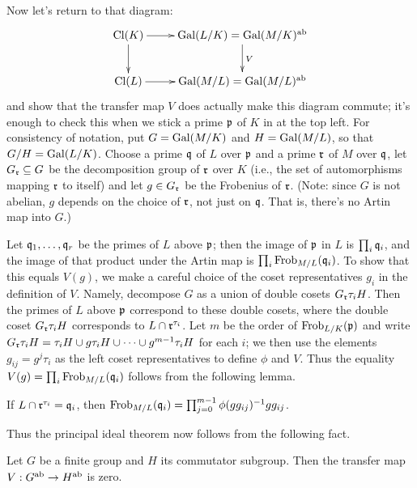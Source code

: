 Now let's return to that diagram:
\[
\xymatrix{
\Cl(K) \ar[r] \ar[d] & \Gal(L/K) = \Gal(M/K)^{\ab} \ar^{V}[d] \\
\Cl(L) \ar[r] & \Gal(M/L) = \Gal(M/L)^{\ab}
}
\]
and show that the transfer map $V$ does actually make this diagram commute;
it's enough to check this when we stick a prime $\mathfrak{p}$ of $K$ in at the
top left. For consistency of notation, put $G = \operatorname{Gal}(M/K)$ and $H
= \operatorname{Gal}(M/L)$, so that $G/H = \operatorname{Gal}(L/K)$.
Choose a prime $\mathfrak{q}$ of $L$ over $\mathfrak{p}$ and a prime $\mathfrak{r}$ of $M$
over $\mathfrak{q}$, let $G_{\mathfrak{r}} \subseteq G$
be the decomposition group of $\mathfrak{r}$
over $K$ (i.e., the set of automorphisms mapping $\mathfrak{r}$ to itself)
and let $g \in G_{\mathfrak{r}}$ be the Frobenius of $\mathfrak{r}$.
(Note: since $G$ is not abelian, $g$ depends on the choice of $\mathfrak{r}$,
not just on $\mathfrak{q}$. That is, there's no Artin map into $G$.)

Let $\mathfrak{q}_1, \dots, \mathfrak{q}_r$ be the primes
of $L$ above $\mathfrak{p}$; then the image of $\mathfrak{p}$ in $L$ is
$\prod_i \mathfrak{q}_i$, and the image of that product under the Artin map
is $\prod_i \operatorname{Frob}_{M/L}(\mathfrak{q}_i)$. To show that this equals $V(g)$, we make a careful choice of the coset representatives $g_i$ in the
definition of $V$. Namely, decompose $G$ as a union of double cosets
$G_{\mathfrak{r}} \tau_i H$. Then the primes of $L$ above $\mathfrak{p}$ correspond
to these double cosets, where the double coset $G_{\mathfrak{r}} \tau_i H$
corresponds to $L \cap \mathfrak{r}^{\tau_i}$.
Let $m$ be the order of $\operatorname{Frob}_{L/K}(\mathfrak{p})$
and write $G_{\mathfrak{r}} \tau_i H = \tau_iH
\cup g\tau_i H \cup \cdots \cup g^{m-1}\tau_i H$
for each $i$; we then use the elements $g_{ij} = g^j \tau_i$ as the left
coset representatives to define $\phi$
and $V$.
Thus the equality $V(g) = \prod_i \operatorname{Frob}_{M/L}(\mathfrak{q}_i)$ follows
from the following lemma.
\begin{lemma} \label{L:transfer Frobenius}
If $L \cap \mathfrak{r}^{\tau_i} = \mathfrak{q}_i$, then
$\operatorname{Frob}_{M/L}(\mathfrak{q}_i) = \prod_{j=0}^{m-1} \phi(g g_{ij})^{-1} g g_{ij} $.
\end{lemma}

Thus the principal ideal theorem now follows from the following fact.
\begin{theorem} \label{T:transfer vanishes}
Let $G$ be a finite group and $H$ its commutator subgroup. Then the transfer
map $V: G^{\operatorname{ab}} \to H^{\operatorname{ab}}$ is zero.
\end{theorem}


